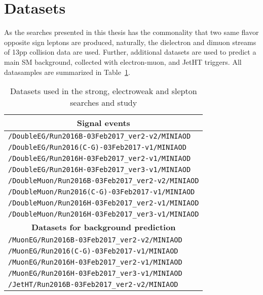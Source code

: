 \section{Datasets}\label{sec:samplesObjects}
\noindent
\justify
As the searches presented in this thesis has the commonality that two same flavor opposite sign leptons are produced, naturally, the dielectron and dimuon streams of 13\TeV pp collision data are used.
Further, additional datasets are used to predict a main SM background, collected with electron-muon, \ptmiss and JetHT triggers. 
All datasamples are summarized in Table~\ref{tab:datasets}.  
\begin{table}[ht!]
\def\arraystretch{1.2}
    \caption{Datasets used in the strong, electroweak and slepton searches and \ptmiss study}
    \label{tab:datasets}
    \begin{center}
        \begin{tabular}{ l}
        \hline\hline 
        \multicolumn{1}{c}{\textbf{Signal events}} \\
        \hline
        \texttt{/DoubleEG/Run2016B-03Feb2017\_ver2-v2/MINIAOD}    \\
        \texttt{/DoubleEG/Run2016(C-G)-03Feb2017-v1/MINIAOD}     \\
        \texttt{/DoubleEG/Run2016H-03Feb2017\_ver2-v1/MINIAOD}    \\
        \texttt{/DoubleEG/Run2016H-03Feb2017\_ver3-v1/MINIAOD}    \\
        \texttt{/DoubleMuon/Run2016B-03Feb2017\_ver2-v2/MINIAOD}   \\
        \texttt{/DoubleMuon/Run2016(C-G)-03Feb2017-v1/MINIAOD}  \\
        \texttt{/DoubleMuon/Run2016H-03Feb2017\_ver2-v1/MINIAOD}    \\
        \texttt{/DoubleMuon/Run2016H-03Feb2017\_ver3-v1/MINIAOD}   \\
        \hline        
        \multicolumn{1}{c}{\textbf{Datasets for background prediction}} \\
        \hline
        \texttt{/MuonEG/Run2016B-03Feb2017\_ver2-v2/MINIAOD}    \\
        \texttt{/MuonEG/Run2016(C-G)-03Feb2017-v1/MINIAOD}    \\
        \texttt{/MuonEG/Run2016H-03Feb2017\_ver2-v1/MINIAOD}    \\
        \texttt{/MuonEG/Run2016H-03Feb2017\_ver3-v1/MINIAOD}    \\           
        \texttt{/JetHT/Run2016B-03Feb2017\_ver2-v2/MINIAOD}   \\

\end{tabular}
\end{center}
\end{table}
